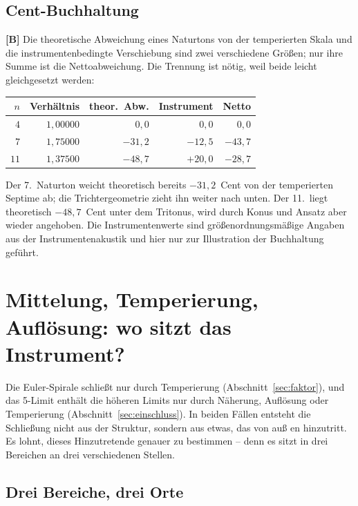\subsection{Cent-Buchhaltung}

\textbf{[B]} Die theoretische Abweichung eines Naturtons von der
temperierten Skala und die instrumentenbedingte Verschiebung sind
zwei verschiedene Gr\"o\ss en; nur ihre Summe ist die
Nettoabweichung. Die Trennung ist n\"otig, weil beide leicht
gleichgesetzt werden:

\begin{center}
\begin{tabular}{rrrrr}
\toprule
$n$ & Verh\"altnis & theor.\ Abw. & Instrument & Netto \\
\midrule
$4$ & $1{,}00000$ & $0{,}0$ & $0{,}0$ & $0{,}0$ \\
$7$ & $1{,}75000$ & $-31{,}2$ & $-12{,}5$ & $-43{,}7$ \\
$11$ & $1{,}37500$ & $-48{,}7$ & $+20{,}0$ & $-28{,}7$ \\
\bottomrule
\end{tabular}
\end{center}

Der 7.~Naturton weicht theoretisch bereits $-31{,}2$~Cent von der
temperierten Septime ab; die Trichtergeometrie zieht ihn weiter nach
unten. Der 11.~liegt theoretisch $-48{,}7$~Cent unter dem Tritonus,
wird durch Konus und Ansatz aber wieder angehoben. Die
Instrumentenwerte sind gr\"o\ss enordnungsm\"a\ss ige Angaben aus der
Instrumentenakustik und hier nur zur Illustration der Buchhaltung
gef\"uhrt.

\section{Mittelung, Temperierung, Aufl\"osung: wo sitzt das Instrument?}
\label{sec:instrument}

Die Euler-Spirale schlie\ss t nur durch Temperierung
(Abschnitt~\ref{sec:faktor}), und das 5-Limit enth\"alt die h\"oheren
Limits nur durch N\"aherung, Aufl\"osung oder Temperierung
(Abschnitt~\ref{sec:einschluss}). In beiden F\"allen entsteht die
Schlie\ss ung nicht aus der Struktur, sondern aus etwas, das von au\ss
en hinzutritt. Es lohnt, dieses Hinzutretende genauer zu bestimmen --
denn es sitzt in drei Bereichen an drei verschiedenen Stellen.

\subsection{Drei Bereiche, drei Orte}

